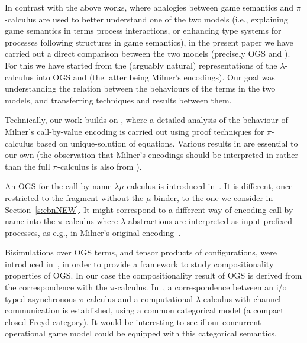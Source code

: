 In contrast with the above works,  where analogies between game semantics and
$\pi$-calculus are used to better understand one of the two models 
(i.e., explaining  game semantics in terms process interactions,  or enhancing type systems for
processes following structures in game semantics), 
in the  present paper we have carried out a direct comparison between 
the two models (precisely OGS and \piI). 
For this we have started from
 the (arguably natural)  representations of the $\lambda$-calculus 
into OGS and \piI  (the latter being Milner's encodings).
Our goal was
understanding the  relation between  the behaviours of the terms in the
two models, and   transferring techniques and results between them.

Technically, our work  builds on
\cite{DurierHS18,Durier20}, where a  detailed analysis of the behaviour of Milner's
call-by-value encoding is carried out using proof techniques for
$\pi$-calculus based on unique-solution of equations.
Various results in \cite{DurierHS18,Durier20} are essential to our own
 (the observation that Milner's
encodings should be interpreted in \piI rather than the full $\pi$-calculus is also from
\cite{DurierHS18,Durier20}).

An OGS %
for the call-by-name $\lambda\mu$-calculus is introduced
in~\cite{DBLP:conf/fossacs/Laird20}. It 
 is different, once restricted to the fragment without the $\mu$-binder, to the one we
 consider in Section~\ref{s:cbnNEW}.  It might correspond  
 to a different way of encoding  call-by-name into the $\pi$-calculus
where $\lambda$-abstractions are interpreted as input-prefixed processes, as e.g., in 
 Milner's original encoding~\cite{Mil92s}.





Bisimulations over  OGS terms, and tensor products of configurations,
were introduced in~\cite{10.1145/2603088.2603150},
in order to provide a framework to study compositionality properties of OGS.
In our case the compositionality result of OGS is derived from the correspondence with the
$\pi$-calculus.
In~\cite{sakayori2019categorical}, a correspondence between an i/o typed asynchronous $\pi$-calculus 
and a computational $\lambda$-calculus with channel communication is established, 
using a common categorical model (a compact closed Freyd category).
It would be interesting to see if our concurrent operational game model could be equipped with this categorical semantics.

